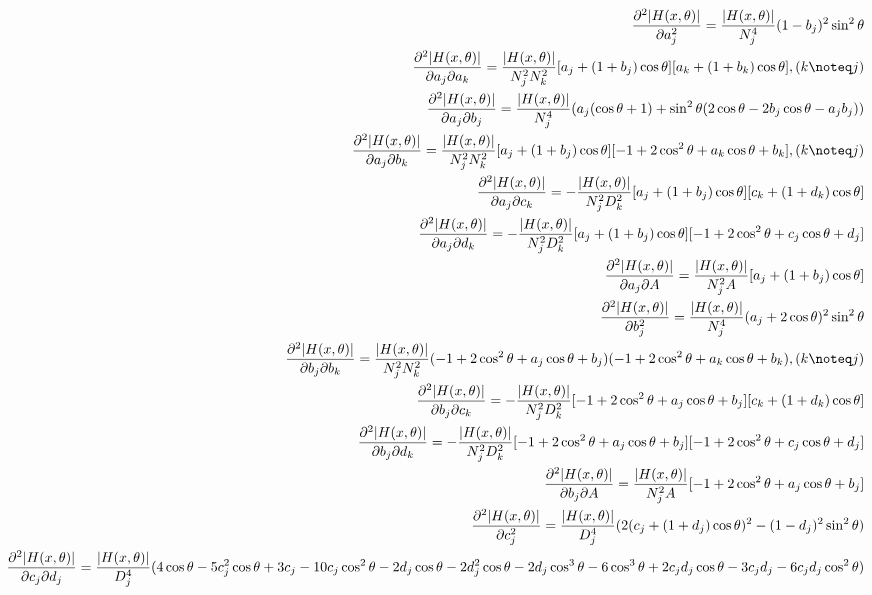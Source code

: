 \documentclass{ctexart}
\begin{document}
\begin{align}
	\frac{\partial^2{|H(x,\theta)|}}{\partial{a_j^2}}=\frac{|H(x,\theta)|}{N_j^4}(1-b_j)^2\sin^2\theta\\
	\frac{\partial^2{|H(x,\theta)|}}{\partial{a_j}\partial{a_k}}=\frac{|H(x,\theta)|}{N_j^2N_k^2}[a_j+(1+b_j)\cos\theta][a_k+(1+b_k)\cos\theta],(k\noteq j)\\
	\frac{\partial^2{|H(x,\theta)|}}{\partial{a_j}\partial{b_j}}=\frac{|H(x,\theta)|}{N_j^4}(a_j(\cos\theta+1)+\sin^2\theta(2\cos\theta-2b_j\cos\theta-a_jb_j))\\
	\frac{\partial^2{|H(x,\theta)|}}{\partial{a_j}\partial{b_k}}=\frac{|H(x,\theta)|}{N_j^2N_k^2}[a_j+(1+b_j)\cos\theta][-1+2\cos^2\theta+a_k\cos\theta+b_k],(k\noteq j)\\
	\frac{\partial^2{|H(x,\theta)|}}{\partial{a_j}\partial{c_k}}=-\frac{|H(x,\theta)|}{N_j^2D_k^2}[a_j+(1+b_j)\cos\theta][c_k+(1+d_k)\cos\theta]\\
	\frac{\partial^2{|H(x,\theta)|}}{\partial{a_j}\partial{d_k}}=-\frac{|H(x,\theta)|}{N_j^2D_k^2}[a_j+(1+b_j)\cos\theta][-1+2\cos^2\theta+c_j\cos\theta+d_j]\\
	\frac{\partial^2{|H(x,\theta)|}}{\partial{a_j}\partial{A}}=\frac{|H(x,\theta)|}{N_j^2A}[a_j+(1+b_j)\cos\theta]\\
	\frac{\partial^2{|H(x,\theta)|}}{\partial{b_j^2}}=\frac{|H(x,\theta)|}{N_j^4}(a_j+2\cos\theta)^2\sin^2\theta\\
	\frac{\partial^2{|H(x,\theta)|}}{\partial{b_j}\partial{b_k}}=\frac{|H(x,\theta)|}{N_j^2N_k^2}(-1+2\cos^2\theta+a_j\cos\theta+b_j)(-1+2\cos^2\theta+a_k\cos\theta+b_k),(k\noteq j)\\
	\frac{\partial^2{|H(x,\theta)|}}{\partial{b_j}\partial{c_k}}=-\frac{|H(x,\theta)|}{N_j^2D_k^2}[-1+2\cos^2\theta+a_j\cos\theta+b_j][c_k+(1+d_k)\cos\theta]\\
	\frac{\partial^2{|H(x,\theta)|}}{\partial{b_j}\partial{d_k}}=-\frac{|H(x,\theta)|}{N_j^2D_k^2}[-1+2\cos^2\theta+a_j\cos\theta+b_j][-1+2\cos^2\theta+c_j\cos\theta+d_j]\\
	\frac{\partial^2{|H(x,\theta)|}}{\partial{b_j}\partial{A}}=\frac{|H(x,\theta)|}{N_j^2A}[-1+2\cos^2\theta+a_j\cos\theta+b_j]\\	
	\frac{\partial^2{|H(x,\theta)|}}{\partial{c_j^2}}=\frac{|H(x,\theta)|}{D_j^4}(2(c_j+(1+d_j)\cos\theta)^2-(1-d_j)^2\sin^2\theta)\\
	\frac{\partial^2{|H(x,\theta)|}}{\partial{c_j}\partial{d_j}}=\frac{|H(x,\theta)|}{D_j^4}(4\cos\theta-5c_j^2\cos\theta+3c_j-10c_j\cos^2\theta-2d_j\cos\theta-2d_j^2\cos\theta-2d_j\cos^3\theta-6\cos^3\theta+2c_jd_j\cos\theta-3c_jd_j-6c_jd_j\cos^2\theta)\\

\end{align}
\end{document}
